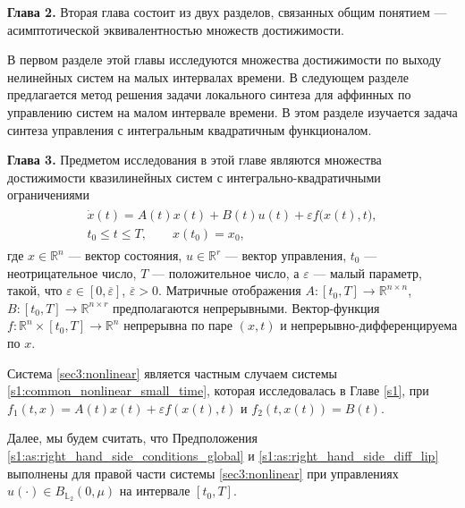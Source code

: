\documentclass[../main.tex]{subfiles}
\begin{document}
\textbf{Глава 2.}
Вторая глава состоит из двух разделов, связанных общим понятием --- асимптотической эквивалентностью множеств достижимости. 

В первом разделе этой главы исследуются множества достижимости по выходу нелинейных систем на малых интервалах времени.
В следующем разделе предлагается метод решения задачи локального синтеза для аффинных по управлению систем на малом интервале времени. 
В этом разделе изучается задача синтеза управления с интегральным квадратичным функционалом. 

\textbf{Глава 3.}
Предметом исследования в этой главе являются множества достижимости квазилинейных систем с интегрально-квадратичными ограничениями
\begin{gather}\label{sec3:nonlinear}
	\begin{gathered}
	\dot{x}(t) = A(t)x(t)+B(t)u(t)+\varepsilon f\big(x(t),t\big), \\ t_0 \leqslant t \leqslant T, \qquad x(t_0) = x_0,
	\end{gathered}
\end{gather}
где $ x \in \mathbb{R}^n $ --- вектор состояния, $ u \in \mathbb{R}^r $ --- вектор управления, $t_0$ --- неотрицательное число, $T$ --- положительное число, а $\varepsilon$ --- малый параметр, такой, что $\varepsilon \in [0,\overline{\varepsilon}]$, $ \overline{\varepsilon} > 0$. 
Матричные отображения $A:[t_0,T] \to \mathbb{R}^{n\times n} $, $B: [t_0,T] \to \mathbb{R}^{n\times r} $ предполагаются непрерывными. 
Вектор-функция $f: \mathbb{R}^n \times [t_0,T] \to \mathbb{R}^n$ непрерывна по паре $(x, t)$ и непрерывно-дифференцируема по $x$.

Система \eqref{sec3:nonlinear} является частным случаем системы \eqref{s1:common_nonlinear_small_time}, которая исследовалась в Главе \ref{s1}, при $f_1(t,x) = A(t) x(t) + \varepsilon f(x(t),t)$ и $f_2(t, x(t)) = B(t)$.

Далее, мы будем считать, что Предположения \ref{s1:as:right_hand_side_conditions_global} и \ref{s1:as:right_hand_side_diff_lip} выполнены для правой части системы \eqref{sec3:nonlinear} при управлениях $ u(\cdot) \in B_{\mathbb{L}_2}(0,\mu) $ на интервале $ [t_0, T]$.
\end{document}
